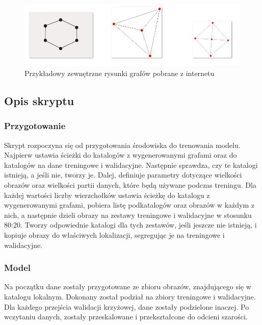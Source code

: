\begin{figure}[ht]
	\centering
	\includegraphics[width=15cm]{partials/images/graphs_tests-internet.png}
	\caption{Przykładowy zewnętrzne rysunki grafów pobrane z internetu}
	\label{Fig:tests-outside-2}
\end{figure}
\FloatBarrier

\subsection{Opis skryptu}

\subsubsection{Przygotowanie}
Skrypt rozpoczyna się od przygotowania środowiska do trenowania modelu.
Najpierw ustawia ścieżki do katalogów z wygenerowanymi grafami oraz do katalogów na dane treningowe i walidacyjne.
Następnie sprawdza, czy te katalogi istnieją, a jeśli nie, tworzy je.
Dalej, definiuje parametry dotyczące wielkości obrazów oraz wielkości partii danych, które będą używane podczas treningu.
Dla każdej wartości liczby wierzchołków ustawia ścieżkę do katalogu z wygenerowanymi grafami,
pobiera listę podkatalogów oraz obrazów w każdym z nich,
a następnie dzieli obrazy na zestawy treningowe i walidacyjne w stosunku 80:20.
Tworzy odpowiednie katalogi dla tych zestawów, jeśli jeszcze nie istnieją,
i kopiuje obrazy do właściwych lokalizacji, segregując je na treningowe i walidacyjne.

\subsubsection{Model}
Na początku dane zostały przygotowane ze zbioru obrazów, znajdującego się w katalogu lokalnym.
Dokonany został podział na zbiory treningowe i walidacyjne.
Dla każdego przejścia walidacji krzyżowej, dane zostały podzielone inaczej.
Po wczytaniu danych, zostały przeskalowane i przekształcone do odcieni szarości.

